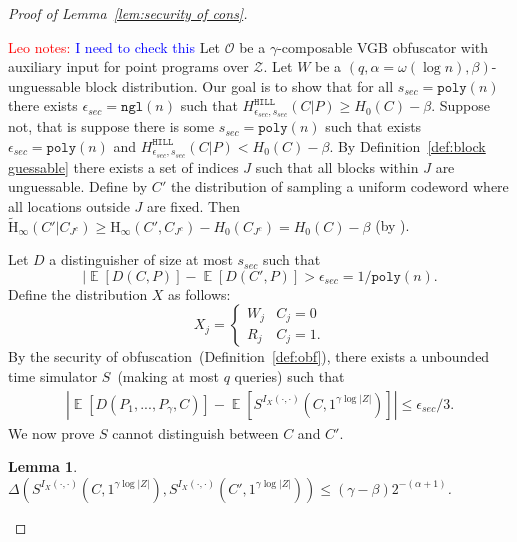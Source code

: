 \documentclass[11pt]{article}
\newcommand{\defref}[1]{\mbox{Definition~\ref{#1}}}
\newcommand{\lemref}[1]{\mbox{Lemma~\ref{#1}}}
\DeclareMathOperator*{\expe}{\mathbb{E}}
\newcommand{\hill}{\ensuremath{\mathtt{HILL}}\xspace}
\newcommand{\poly}{\ensuremath{\mathtt{poly}}\xspace}
\newcommand{\ngl}{\ensuremath{\mathtt{ngl}}\xspace}
\newcommand{\Hoo}{\mathrm{H}_\infty}
\newcommand{\Hav}{\tilde{\mathrm{H}}_\infty}
\newtheorem{lemma}[theorem]{Lemma}
\newcommand{\authnote}[2]{{\textcolor{red}{\textsf{#1 notes: }\textcolor{blue}{ #2}}\marginpar{\textcolor{red}{\textbf{!!!!!}}}}}
\newcommand{\authnote}[2]{}
\newcommand{\lnote}[1]{{\authnote{Leo}{#1}}}
\begin{document}
\begin{proof}[Proof of \lemref{lem:security of cons}]
\label{app:security of main cons}

\lnote{I need to check this}
Let $\mathcal{O}$ be a $\gamma$-composable VGB obfuscator with auxiliary input for point programs over $\mathcal{Z}$.  Let $W$ be a $(q, \alpha = \omega(\log n), \beta)$-unguessable block distribution.  Our goal is to show that for all $s_{sec} = \poly(n)$ there exists $\epsilon_{sec} =\ngl(n)$ such that $H^{\hill}_{\epsilon_{sec}, s_{sec}}(C|P)\geq H_0(C)- \beta$. %
Suppose not, that is suppose there is some $s_{sec} = \poly(n)$ such that exists $\epsilon_{sec} = \poly(n)$ and $H^{\hill}_{\epsilon_{sec}, s_{sec}}(C|P) < H_0(C)-\beta$.
By \defref{def:block guessable} there exists a set of indices $J$ such that all blocks within $J$ are unguessable.  Define by $C'$ the distribution of sampling a uniform codeword where all locations outside $J$ are fixed.  Then 
$\Hav(C' | C_{J^c}) \ge \Hoo(C', C_{J^c}) - H_0(C_{J^c})  = H_0(C) - \beta$ (by \cite[Lemma 2.2b]{DBLP:journals/siamcomp/DodisORS08}). 

Let $D$ a distinguisher of size at most $s_{sec}$ such that
\[
| \expe[D(C, P)] - \expe[D(C', P)] > \epsilon_{sec} = 1/\poly(n).
\]
Define the distribution $X$ as follows:
\[X_j =
\begin{cases}
W_j & C_j = 0\\
R_j & C_j = 1.
\end{cases}\]  By the security of obfuscation~(\defref{def:obf}), there exists a unbounded time simulator $S$~(making at most $q$ queries) such that
\begin{align}
\label{eq:dist before}
|\expe [D(P_1,..., P_\gamma, C)] - \expe [S^{I_X(\cdot, \cdot)}(C, 1^{\gamma \log |Z|})] |\leq \epsilon_{sec}/3.
\end{align}
We now prove $S$ cannot distinguish between $C$ and $C'$.
\begin{lemma}
\label{lem:sim cannot distinguish}
$\Delta(S^{I_X(\cdot, \cdot)}(C, 1^{\gamma \log |Z|}), S^{I_X(\cdot, \cdot)}(C', 1^{\gamma \log |Z|})) \le (\gamma-\beta) 2^{-(\alpha+1)}$.
\end{lemma}


\end{proof}
\end{document}
